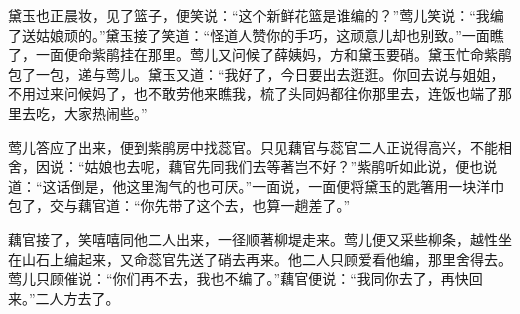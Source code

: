 \begin{parag}


    黛玉也正晨妆，见了篮子，便笑说：“这个新鲜花篮是谁编的？”莺儿笑说：“我编了送姑娘顽的。”黛玉接了笑道：“怪道人赞你的手巧，这顽意儿却也别致。”一面瞧了，一面便命紫鹃挂在那里。莺儿又问候了薛姨妈，方和黛玉要硝。黛玉忙命紫鹃包了一包，递与莺儿。黛玉又道：“我好了，今日要出去逛逛。你回去说与姐姐，不用过来问候妈了，也不敢劳他来瞧我，梳了头同妈都往你那里去，连饭也端了那里去吃，大家热闹些。”
\end{parag}


\begin{parag}


    莺儿答应了出来，便到紫鹃房中找蕊官。只见藕官与蕊官二人正说得高兴，不能相舍，因说：“姑娘也去呢，藕官先同我们去等著岂不好？”紫鹃听如此说，便也说道：“这话倒是，他这里淘气的也可厌。”一面说，一面便将黛玉的匙箸用一块洋巾包了，交与藕官道：“你先带了这个去，也算一趟差了。”
\end{parag}


\begin{parag}


    藕官接了，笑嘻嘻同他二人出来，一径顺著柳堤走来。莺儿便又采些柳条，越性坐在山石上编起来，又命蕊官先送了硝去再来。他二人只顾爱看他编，那里舍得去。莺儿只顾催说：“你们再不去，我也不编了。”藕官便说：“我同你去了，再快回来。”二人方去了。
\end{parag}


